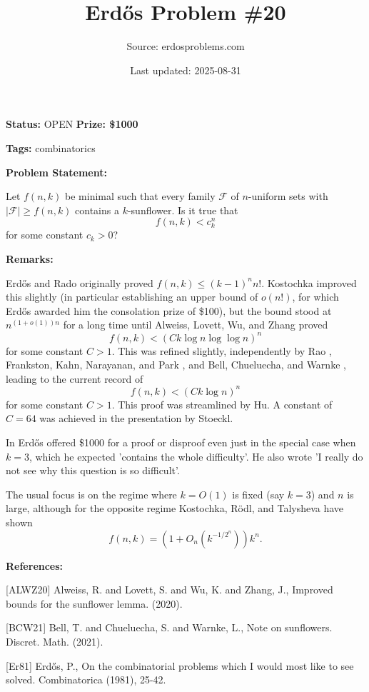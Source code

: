 \documentclass{article}
\title{Erd\H{o}s Problem \#20}
\date{Last updated: 2025-08-31}
\author{Source: erdosproblems.com}
\begin{document}
\maketitle

\noindent\textbf{Status:} OPEN \quad \textbf{Prize: \$1000}

\noindent\textbf{Tags:} combinatorics

\medskip
\noindent\textbf{Problem Statement:}

Let $f(n,k)$ be minimal such that every family $\mathcal{F}$ of $n$-uniform sets with $\lvert \mathcal{F}\rvert \geq f(n,k)$ contains a $k$-sunflower. Is it true that\[f(n,k) < c_k^n\]for some constant $c_k>0$?

\bigskip
\noindent\textbf{Remarks:}

Erd\H{o}s and Rado \cite{ErRa60} originally proved $f(n,k)\leq (k-1)^nn!$. Kostochka \cite{Ko97} improved this slightly (in particular establishing an upper bound of $o(n!)$, for which Erd\H{o}s awarded him the consolation prize of \$100), but the bound stood at $n^{(1+o(1))n}$ for a long time until Alweiss, Lovett, Wu, and Zhang \cite{ALWZ20} proved\[f(n,k) < (Ck\log n\log\log n)^n\]for some constant $C>1$. This was refined slightly, independently by Rao \cite{Ra20}, Frankston, Kahn, Narayanan, and Park \cite{FKNP19}, and Bell, Chueluecha, and Warnke \cite{BCW21}, leading to the current record of\[f(n,k) < (Ck\log n)^n\]for some constant $C>1$. This proof was streamlined by Hu. A constant of $C=64$ was achieved in the presentation by Stoeckl.

In \cite{Er81} Erd\H{o}s offered \$1000 for a proof or disproof even just in the special case when $k=3$, which he expected 'contains the whole difficulty'. He also wrote 'I really do not see why this question is so difficult'.

The usual focus is on the regime where $k=O(1)$ is fixed (say $k=3$) and $n$ is large, although for the opposite regime Kostochka, R\"{o}dl, and Talysheva \cite{KRT99} have shown\[f(n,k)=(1+O_n(k^{-1/2^n}))k^n.\]

\bigskip
\noindent\textbf{References:}

[ALWZ20] Alweiss, R. and Lovett, S. and Wu, K. and Zhang, J., Improved bounds for the sunflower lemma. (2020).
 
 [BCW21] Bell, T. and Chueluecha, S. and Warnke, L., Note on sunflowers. Discret. Math. (2021).
 
 [Er81] Erd\H{o}s, P., On the combinatorial problems which I would most like to see solved. Combinatorica (1981), 25-42.
 
\end{document}
